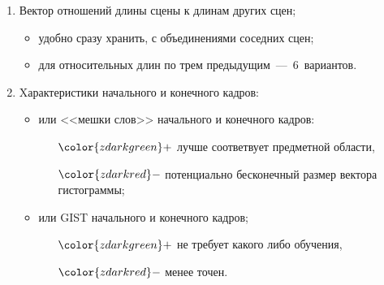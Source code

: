 {    \begin{enumerate}
        \item Вектор отношений длины сцены к длинам других сцен;
            \begin{itemize}
                \item удобно сразу хранить, с объединениями соседних сцен;
                \item для относительных длин
                    по трем предыдущим\ ---~$6$~вариантов.
            \end{itemize}
        \vspace{6pt}
        \item Xарактеристики начального и конечного кадров:
        \begin{itemize}
            \item или <<мешки слов>> начального и конечного кадров:
            \begin{itemize}
                \item[${\color{zdarkgreen}+}$] лучше соответвует предметной области,
                \item[${\color{zdarkred}-}$] потенциально бесконечный размер вектора гистограммы;
            \end{itemize}
            \item или GIST начального и конечного кадров;
            \begin{itemize}
                \item[${\color{zdarkgreen}+}$] не требует какого либо обучения,
                \item[${\color{zdarkred}-}$] менее точен.
            \end{itemize}
        \end{itemize}
    \end{enumerate}
}

% 


